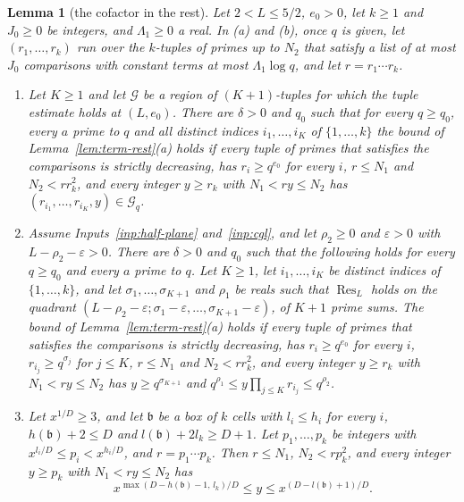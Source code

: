 \documentclass[11pt]{article}
\newtheorem{lemma}[theorem]{Lemma}
\theoremstyle{definition}
\begin{document}
\begin{lemma}[the cofactor in the rest]\label{lem:term-rest-cof}
Let $2 < L \le 5/2$, $e_0 > 0$, let $k \ge 1$ and $J_0 \ge 0$ be integers, and $\Lambda_1 \ge 0$ a real. In (a) and
(b), once $q$ is given, let $(r_1, \dots, r_k)$ run over the $k$-tuples of primes up to $N_2$ that satisfy a list of
at most $J_0$ comparisons with constant terms at most $\Lambda_1 \log q$, and let $r = r_1 \cdots r_k$.
\begin{enumerate}
\item[(a)] Let $K \ge 1$ and let $\mathcal G$ be a region of $(K + 1)$-tuples for which the tuple estimate holds at
  $(L, e_0)$. There are $\delta > 0$ and $q_0$ such that for every $q \ge q_0$, every $a$ prime to $q$ and all
  distinct indices $i_1, \dots, i_K$ of $\{1, \dots, k\}$ the bound of Lemma~\ref{lem:term-rest}(a) holds if every
  tuple of primes that satisfies the comparisons is strictly decreasing, has $r_i \ge q^{e_0}$ for every $i$, $r \le
  N_1$ and $N_2 < r r_k^2$, and every integer $y \ge r_k$ with $N_1 < ry \le N_2$ has $(r_{i_1}, \dots, r_{i_K}, y)
  \in \mathcal G_q$.
\item[(b)] Assume Inputs~\ref{inp:half-plane} and~\ref{inp:cgl}, and let $\rho_2 \ge 0$ and $\varepsilon > 0$ with $L -
\rho_2 -
  \varepsilon > 0$. There are $\delta > 0$ and $q_0$ such that the following holds for every $q \ge q_0$ and every $a$
  prime to $q$. Let $K \ge 1$, let $i_1, \dots, i_K$ be distinct indices of $\{1, \dots, k\}$, and let $\sigma_1,
  \dots, \sigma_{K + 1}$ and $\rho_1$ be reals such that $\operatorname{Res}_L$ holds on the quadrant $(L - \rho_2 -
  \varepsilon; \sigma_1 - \varepsilon, \dots, \sigma_{K + 1} - \varepsilon)$, of $K + 1$ prime sums. The bound of
  Lemma~\ref{lem:term-rest}(a) holds if every tuple of primes that satisfies the comparisons is strictly decreasing,
  has $r_i \ge q^{e_0}$ for every $i$, $r_{i_j} \ge q^{\sigma_j}$ for $j \le K$, $r \le N_1$ and $N_2 < r r_k^2$,
  and every integer $y \ge r_k$ with $N_1 < ry \le N_2$ has $y \ge q^{\sigma_{K + 1}}$ and $q^{\rho_1} \le y
  \prod_{j \le K} r_{i_j} \le q^{\rho_2}$.
\item[(c)] Let $x^{1/D} \ge 3$, and let $\mathfrak b$ be a box of $k$ cells with $l_i \le h_i$ for every $i$,
$h(\mathfrak
  b) + 2 \le D$ and $l(\mathfrak b) + 2 l_k \ge D + 1$. Let $p_1, \dots, p_k$ be integers with $x^{l_i/D} \le p_i <
  x^{h_i/D}$, and $r = p_1 \cdots p_k$. Then $r \le N_1$, $N_2 < r p_k^2$, and every integer $y \ge p_k$ with $N_1 < ry
  \le N_2$ has
  \[
    x^{\max(D - h(\mathfrak b) - 1,\, l_k)/D} \le y \le x^{(D - l(\mathfrak b) + 1)/D}.
  \]
\end{enumerate}
\end{lemma}
\end{document}
